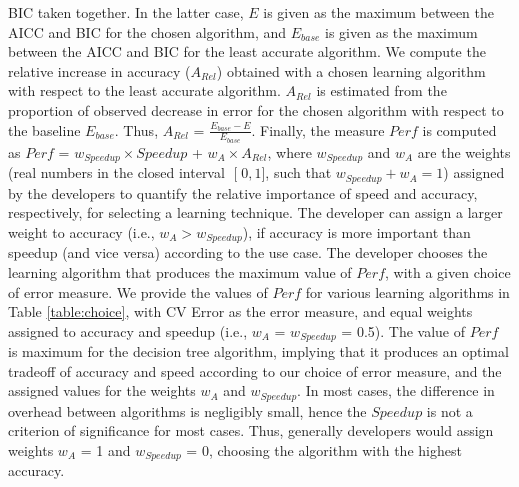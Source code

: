 \documentclass[conference]{IEEEtran}
\begin{document}
   BIC taken together. In the latter case, $E$ is given as the maximum between
   the AICC and BIC for the chosen algorithm, and $E_{\mathit{base}}$ is given as the maximum between the AICC and BIC
   for the least accurate algorithm.
We compute the relative increase in accuracy ($A_{\mathit{Rel}}$) obtained with a chosen learning algorithm with respect
    to the least accurate algorithm. $A_{\mathit{Rel}}$ is estimated from the proportion of observed decrease in error for the chosen algorithm with respect to the baseline
    $E_{\mathit{base}}$. Thus,
  $A_{\mathit{Rel}}$  = $\frac{E_{\mathit{base}} - E}{E_{\mathit{base}}}$.
   Finally, the measure  $\mathit{Perf}$ is computed as $\mathit{Perf}$ = $w_{\mathit{Speedup}} \times \mathit{Speedup}$ + $w_A \times A_{\mathit{Rel}}$,
   where $w_{\mathit{Speedup}}$ and $w_A$ are the weights
  (real numbers in the closed interval $\mathclose{[}0, 1\mathclose{]}$, such that $w_{\mathit{Speedup}} + w_A = 1$) assigned by the developers to quantify
   the relative importance of speed and  accuracy, respectively, for selecting a learning technique. The
   developer can assign a larger weight to accuracy (i.e., $w_A > w_{\mathit{Speedup}}$), if accuracy is more important than speedup (and vice versa)
   according to the use case. The developer chooses the learning algorithm that produces the
   maximum value of $\mathit{Perf}$, with a given choice of error measure.
   We provide the values of $\mathit{Perf}$ for various learning algorithms in Table \ref{table:choice}, with
    CV Error as the error measure, and equal weights assigned to accuracy and speedup (i.e., $w_A$ = $w_{\mathit{Speedup}}$ = 0.5).
    The value of $\mathit{Perf}$ is maximum for the decision tree algorithm, implying that it produces an optimal tradeoff of accuracy and speed according to our choice of error measure, and the assigned values for the weights $w_A$ and $w_{\mathit{Speedup}}$.
    In most cases, the difference in overhead between algorithms is negligibly small, hence the $Speedup$ is
    not a criterion of significance for most cases. Thus, generally developers would assign weights $w_A$ = 1
    and $w_{\mathit{Speedup}}$ = 0, choosing the algorithm with the highest accuracy. 
\end{document}
